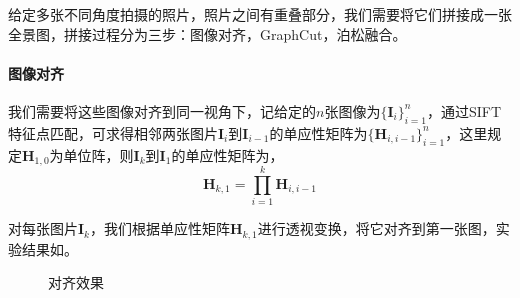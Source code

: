 \documentclass[11pt,a4paper]{article}
\begin{document}
给定多张不同角度拍摄的照片，照片之间有重叠部分，我们需要将它们拼接成一张全景图，拼接过程分为三步：图像对齐，GraphCut，泊松融合。

\paragraph{图像对齐} 我们需要将这些图像对齐到同一视角下，记给定的$n$张图像为$\{\mathbf{I}_i\}_{i=1}^n$，通过SIFT\cite{lowe1999object}特征点匹配，可求得相邻两张图片$\mathbf{I}_{i}$到$\mathbf{I}_{i-1}$的单应性矩阵为$\{\mathbf{H}_{i,i-1}\}_{i=1}^{n}$，这里规定$\mathbf{H}_{1,0}$为单位阵，则$\mathbf{I}_k$到$\mathbf{I}_1$的单应性矩阵为，
\begin{equation}
    \mathbf{H}_{k,1} = \prod_{i=1}^k \mathbf{H}_{i,i-1}
\end{equation}

对每张图片$\mathbf{I}_k$，我们根据单应性矩阵$\mathbf{H}_{k,1}$进行透视变换，将它对齐到第一张图，实验结果如。

\begin{figure}[H]
    \centering
    \caption{对齐效果}
    \label{fig:campus_align}
\end{figure}
\end{document}
